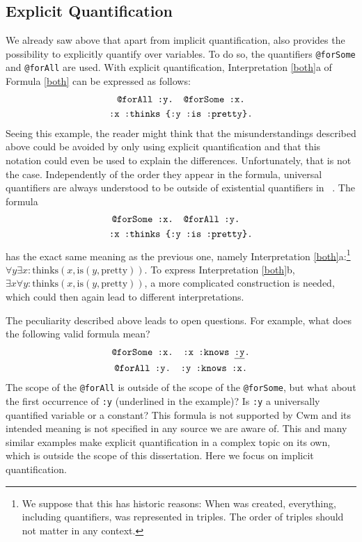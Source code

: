 \subsection{Explicit Quantification}\label{remarkExplicitQuantification}
We already saw above that apart from implicit quantification, \nthreelogic also provides the possibility to explicitly quantify over variables.
To do so, the quantifiers \verb!@forSome!
and \verb!@forAll! are used. With explicit quantification, Interpretation \ref{both}a of Formula \ref{both} can be expressed as follows:
\begin{multline}\notag
 \texttt{@forAll :y. @forSome :x.}\\\texttt{:x :thinks \{:y :is :pretty\}.}
\end{multline}
Seeing this example, the reader might think that the misunderstandings described above could be avoided by only using explicit quantification and that this notation could 
even be used to explain the differences. Unfortunately, that is not the case. Independently of the order they appear in the formula, universal quantifiers are always understood to
be outside of  existential quantifiers in \nthree~\cite{Notation3}.
The formula
\begin{multline}\notag
 \texttt{@forSome :x. @forAll :y. }\\\texttt{:x :thinks \{:y :is :pretty\}.}
\end{multline}
has the exact same meaning as the previous one, namely Interpretation \ref{both}a:\footnote{We suppose that this has historic reasons: 
When \nthree was created, everything, including quantifiers,  was represented in triples. The order of triples should not matter in any context.}
$ %
\forall y \exists x : \text{thinks}(x,\text{is}(y,\text{pretty})) %
$.
To express Interpretation \ref{both}b,
$ %
\exists x \forall  y : \text{thinks}(x,\text{is}(y,\text{pretty})) %
$, %
a more complicated 
construction is needed, which could then again lead to different interpretations. 

The peculiarity described above leads to open questions. %
For example, what does the following valid \nthree formula mean?
\begin{multline}
 \texttt{@forSome :x. :x :knows \underline{:y}.}\\ \texttt{@forAll :y. :y :knows :x.}
\end{multline}
The scope of the \texttt{@forAll} is outside of the scope of the \texttt{@forSome}, but what about the first occurrence of \texttt{:y} (underlined in the example)? Is \texttt{:y} a universally 
quantified variable or a constant?
This formula is not supported by Cwm and its intended meaning is not specified in any source we are aware of. 
This and many similar examples make explicit quantification in \nthree a complex topic on its own, which is outside 
the scope of this dissertation. Here we focus on implicit quantification.